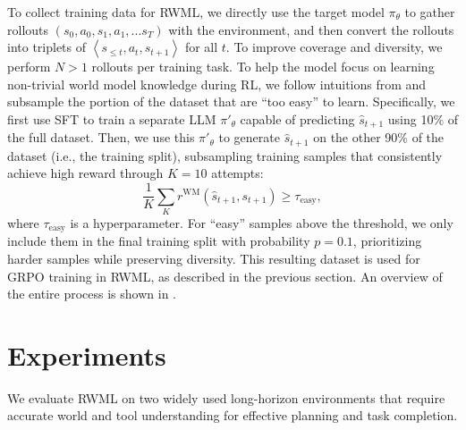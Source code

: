 \documentclass{article}
\theoremstyle{plain}
\theoremstyle{definition}
\theoremstyle{remark}
\newcommand{\ie}{i.e.,}
\newcommand{\shortmethod}[0]{RWML}
\newcommand{\wmrlshort}[0]{\shortmethod}
\begin{document}
To collect training data for \wmrlshort{}, we directly use the target model $\pi_\theta$ to gather rollouts $(s_0, a_0, s_1, a_1, ... s_T)$ with the environment, and then convert the rollouts into triplets of $\left\langle s_{\le t}, a_t, s_{t+1} \right\rangle$ for all $t$.
To improve coverage and diversity, we perform $N>1$ rollouts per training task.
To help the model focus on learning non-trivial world model knowledge during RL, we follow intuitions from \citep{snell2024scalingllmtesttimecompute,sun2025rlgrokkingrecipedoes} and subsample the portion of the dataset that are ``too easy'' to learn.
Specifically, we first use SFT to train a separate LLM $\pi'_\theta$ capable of predicting $\hat{s}_{t+1}$ using 10\% of the full dataset.
Then, we use this $\pi'_\theta$ to generate $\hat{s}_{t+1}$ on the other 90\% of the dataset (\ie{} the training split), subsampling training samples that consistently achieve high reward through $K=10$ attempts:
\begin{equation}
    \label{eq:too_easy_eq}
    \frac{1}{K}\sum\limits_{K} r^{\mathrm{WM}}(\hat{s}_{t+1}, s_{t+1}) \ge \tau_{\mathrm{easy}},
\end{equation}
where $\tau_{\mathrm{easy}}$ is a hyperparameter.
For ``easy'' samples above the threshold, we only include them in the final training split with probability $p=0.1$, prioritizing harder samples while preserving diversity.
This resulting dataset is used for GRPO training in \wmrlshort{}, as described in the previous section.
An overview of the entire process is shown in .

\section{Experiments}
\label{sec:experiments}

We evaluate \wmrlshort{} on two widely used long-horizon environments that require accurate world and tool understanding for effective planning and task completion.
\end{document}
